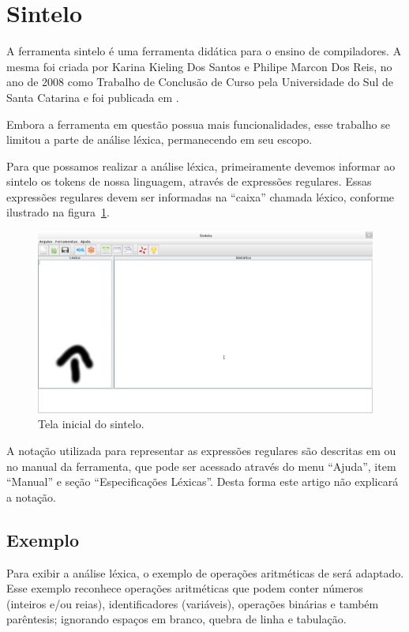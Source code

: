\section{Sintelo} %
\label{sec:sintelo}
A ferramenta sintelo é uma ferramenta didática para o ensino de compiladores. A mesma foi criada por Karina Kieling Dos Santos e Philipe Marcon Dos Reis, no ano de 2008 como Trabalho de Conclusão de Curso pela Universidade
do Sul de Santa Catarina e foi publicada em \cite{sintelo}. 

Embora a ferramenta em questão possua mais funcionalidades, esse trabalho se limitou a parte de análise léxica, permanecendo em seu escopo.

Para que possamos realizar a análise léxica, primeiramente devemos informar ao sintelo os tokens de nossa linguagem, através de expressões regulares. Essas expressões regulares devem ser informadas na ``caixa'' chamada léxico, conforme ilustrado na figura~\ref{sintelo-inicial}.

\begin{figure}[ht!]
	\centering
	\includegraphics[scale=0.28]{imgs/sintelo-inicial-ed}
	\caption{Tela inicial do sintelo.}
	\label{sintelo-inicial}
\end{figure}

A notação utilizada para representar as expressões regulares são descritas em \cite{sintelo} ou no manual da ferramenta, que pode ser acessado através do menu ``Ajuda'', item ``Manual'' e seção ``Especificações Léxicas''. Desta forma este artigo não explicará a notação.

\subsection{Exemplo} %
\label{sub:exemplo}
Para exibir a análise léxica, o exemplo de operações aritméticas de \cite{Sebesta201201} será adaptado. Esse exemplo reconhece operações aritméticas que podem conter números (inteiros e/ou reias), identificadores (variáveis), operações binárias e também parêntesis; ignorando espaços em branco, quebra de linha e tabulação.

